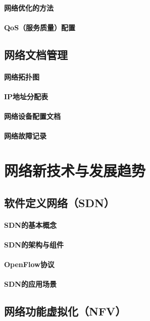 \documentclass{book}
\begin{document}
\subsubsection{网络优化的方法}
\subsubsection{QoS（服务质量）配置}
\section{网络文档管理}
\subsubsection{网络拓扑图}
\subsubsection{IP地址分配表}
\subsubsection{网络设备配置文档}
\subsubsection{网络故障记录}

\chapter{网络新技术与发展趋势}
\section{软件定义网络（SDN）}
\subsubsection{SDN的基本概念}
\subsubsection{SDN的架构与组件}
\subsubsection{OpenFlow协议}
\subsubsection{SDN的应用场景}
\section{网络功能虚拟化（NFV）}
\end{document}
